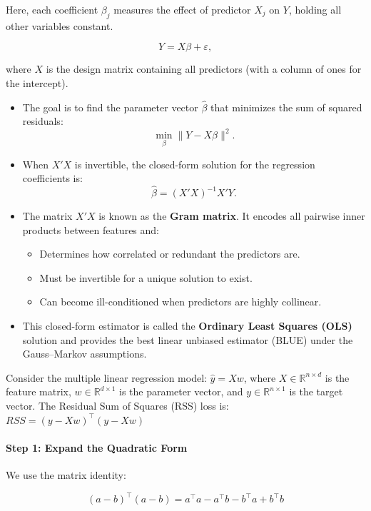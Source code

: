 \documentclass[10pt,a4paper]{article}
\begin{document}
	Here, each coefficient $\beta_j$ measures the effect of predictor $X_j$ on $Y$, holding all other variables constant.


	\[
	Y = X\beta + \varepsilon,
	\]
	
	where $X$ is the design matrix containing all predictors (with a column of ones for the intercept).
	\begin{itemize}
		\item The goal is to find the parameter vector $\hat{\beta}$ that minimizes the sum of squared residuals:
		\[
			\min_{\beta} \| Y - X\beta \|^2.
		\]

		\item When $X'X$ is invertible, the closed-form solution for the regression coefficients is:
		\[
		\hat{\beta} = (X'X)^{-1} X'Y.
		\]

		\item The matrix $X'X$ is known as the \textbf{Gram matrix}. It encodes all pairwise inner products between features and:
		\begin{itemize}
			\item Determines how correlated or redundant the predictors are.
			\item Must be invertible for a unique solution to exist.
			\item Can become ill-conditioned when predictors are highly collinear.
		\end{itemize}

		\item This closed-form estimator is called the \textbf{Ordinary Least Squares (OLS)} solution and provides the best linear unbiased estimator (BLUE) under the Gauss–Markov assumptions.
	\end{itemize}
	
	
	Consider the multiple linear regression model: $\hat{y} = Xw $, where $ X \in \mathbb{R}^{n \times d} $ is the feature matrix, $ w \in \mathbb{R}^{d \times 1}$ is the parameter vector, and $ y \in \mathbb{R}^{n \times 1}$ is the target vector. The Residual Sum of Squares (RSS) loss is: $RSS=(y-Xw)^\top(y-Xw) $
	
	
	\paragraph{Step 1: Expand the Quadratic Form}
	
	We use the matrix identity:
	
	\[
	(a-b)^\top(a-b)
	=
	a^\top a - a^\top b - b^\top a + b^\top b
	\]
\end{document}
